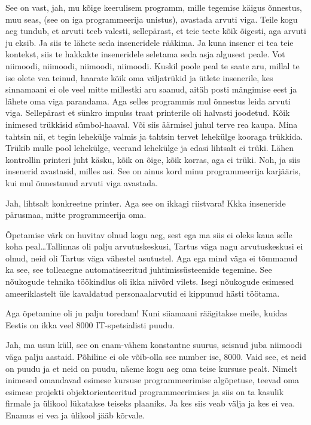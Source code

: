 See on vast, jah, mu kõige keerulisem programm, mille tegemise käigus õnnestus, muu seas, (see on iga programmeerija unistus), avastada arvuti viga. Teile kogu aeg tundub, et arvuti teeb valesti, sellepärast, et teie teete kõik õigesti, aga arvuti ju eksib. Ja siis te lähete seda inseneridele rääkima. Ja kuna insener ei tea teie kontekst, siis te hakkakte inseneridele seletama seda asja algusest peale. Vot niimoodi, niimoodi, niimoodi, niimoodi. Kuskil poole peal te saate aru, millal te ise olete vea teinud, haarate kõik oma väljatrükid ja ütlete insenerile, kes sinnamaani ei ole veel mitte millestki aru saanud, aitäh posti mängimise eest ja lähete oma viga parandama. Aga selles programmis mul õnnestus leida arvuti viga. Sellepärast et sünkro impulss traat printerile oli halvasti joodetud. Kõik inimesed trükkisid sümbol-haaval. Või siis äärmisel juhul terve rea kaupa. Mina tahtsin nii, et tegin lehekülje valmis ja tahtsin tervet lehekülge kooraga trükkida. Trükib mulle pool lehekülge, veerand lehekülge ja edasi lihtsalt ei trüki. Lähen kontrollin printeri juht käsku, kõik on õige, kõik korras, aga ei trüki. Noh, ja siis insenerid avastasid, milles asi. See on ainus kord minu programmeerija karjääris, kui mul õnnestunud arvuti viga avastada. 


Jah, lihtsalt konkreetne printer. Aga see on ikkagi riistvara! Kkka inseneride pärusmaa, mitte  programmeerija oma.


Õpetamise värk on huvitav olnud kogu aeg, sest ega ma siis ei oleks kaua selle koha peal\ldots Tallinnas oli palju arvutuskeskusi, Tartus väga nagu arvutuskeskusi ei olnud, neid oli Tartus väga vähestel asutustel. Aga ega mind väga ei tõmmanud ka see, see tolleaegne  automatiseeritud juhtimissüsteemide tegemine. See nõukogude tehnika töökindlus oli ikka niivõrd vilets. Isegi nõukogude esimesed ameeriklastelt üle kavaldatud personaalarvutid ei kippunud hästi töötama. 

Aga õpetamine oli ju palju toredam! Kuni siiamaani räägitakse meile, kuidas Eestis on ikka veel 8000 IT-spetsialisti puudu. 


Jah, ma usun küll, see on enam-vähem konstantne suurus, seisnud juba niimoodi väga palju aastaid. Põhiline ei ole võib-olla see number ise, 8000. Vaid see, et neid on puudu ja et neid on puudu,  näeme kogu aeg oma teise kursuse pealt. Nimelt inimesed omandavad esimese kursuse programmeerimise algõpetuse, teevad oma esimese projekti objektorienteeritud programmeerimises ja siis on ta kasulik firmale ja ülikool lükatakse teiseks plaaniks. Ja kes siis veab välja ja kes ei vea. Enamus ei vea ja ülikool jääb kõrvale. 


